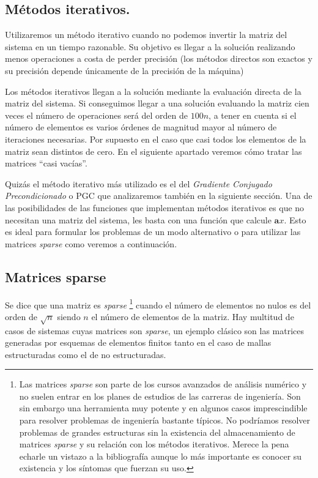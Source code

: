 \subsection{Métodos iterativos.}

Utilizaremos un método iterativo cuando no podemos invertir la matriz
del sistema en un tiempo razonable. Su objetivo es llegar a la solución
realizando menos operaciones a costa de perder precisión (los métodos
directos son exactos y su precisión depende únicamente de la precisión
de la máquina) 

Los métodos iterativos llegan a la solución mediante la evaluación
directa de la matriz del sistema. Si conseguimos llegar a una solución
evaluando la matriz cien veces el número de operaciones será del orden
de $100n$, a tener en cuenta si el número de elementos es varios
órdenes de magnitud mayor al número de iteraciones necesarias. Por
supuesto en el caso que casi todos los elementos de la matriz sean
distintos de cero. En el siguiente apartado veremos cómo tratar las
matrices {}``casi vacías''.

Quizás el método iterativo más utilizado es el del \emph{Gradiente
Conjugado Precondicionado} o PGC que analizaremos también en la siguiente
sección. Una de las posibilidades de las funciones que implementan
métodos iterativos es que no necesitan una matriz del sistema, les
basta con una función que calcule $\mathbf{a}x$. Esto es ideal para
formular los problemas de un modo alternativo o para utilizar las
matrices \emph{sparse} como veremos a continuación.


\subsection{Matrices sparse}

Se dice que una matriz es \emph{sparse}%
\footnote{Las matrices \emph{sparse} son parte de los cursos avanzados de análisis
numérico y no suelen entrar en los planes de estudios de las carreras
de ingeniería. Son sin embargo una herramienta muy potente y en algunos
casos imprescindible para resolver problemas de ingeniería bastante
típicos. No podríamos resolver problemas de grandes estructuras sin
la existencia del almacenamiento de matrices \emph{sparse} y su relación
con los métodos iterativos. Merece la pena echarle un vistazo a la
bibliografía aunque lo más importante es conocer su existencia y los
síntomas que fuerzan su uso.%
} cuando el número de elementos no nulos es del orden de $\sqrt{n}$
siendo $n$ el número de elementos de la matriz. Hay multitud de casos
de sistemas cuyas matrices son \emph{sparse}, un ejemplo clásico son
las matrices generadas por esquemas de elementos finitos tanto en
el caso de mallas estructuradas como el de no estructuradas.

